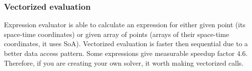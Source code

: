 \subsubsection{Vectorized evaluation}

Expression evaluator is able to calculate an expression for either given point
(its space-time coordinates) or given array of points (arrays of their
space-time coordinates, it uses SoA). Vectorized evaluation is faster then
sequential due to a better data access pattern. Some expressions give measurable
speedup factor $4.6$. Therefore, if you are creating your own solver, it
worth making vectorized calls.
